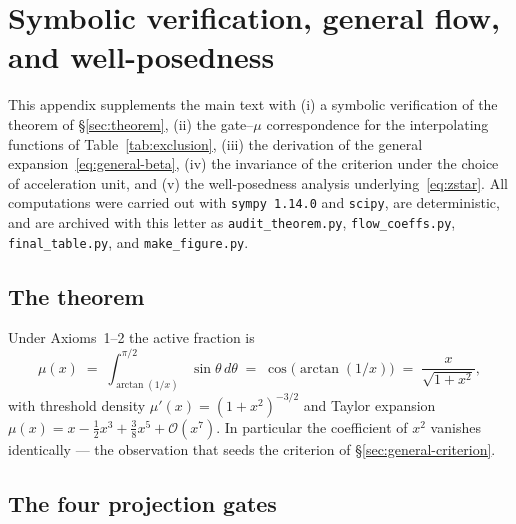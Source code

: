 \documentclass[11pt]{article}
\theoremstyle{plain}
\begin{document}
\appendix

\section{Symbolic verification, general flow, and well-posedness}
\label{app:audit}

This appendix supplements the main text with (i) a symbolic verification of the
theorem of \S\ref{sec:theorem}, (ii) the gate--$\mu$ correspondence for the
interpolating functions of Table~\ref{tab:exclusion}, (iii) the derivation of
the general expansion~\eqref{eq:general-beta}, (iv) the invariance of the
criterion under the choice of acceleration unit, and (v) the well-posedness
analysis underlying~\eqref{eq:zstar}. All computations were carried out with
\texttt{sympy 1.14.0} and \texttt{scipy}, are deterministic, and are archived
with this letter as \verb|audit_theorem.py|, \verb|flow_coeffs.py|,
\verb|final_table.py|, and \verb|make_figure.py|.

\subsection{The theorem}

Under Axioms~1--2 the active fraction is
\begin{equation}
\mu(x) \;=\; \int_{\arctan(1/x)}^{\pi/2} \sin\theta\,d\theta
       \;=\; \cos\!\bigl(\arctan(1/x)\bigr)
       \;=\; \frac{x}{\sqrt{1+x^{2}}},
\label{app:mu-thm}
\end{equation}
with threshold density $\mu'(x)=(1+x^{2})^{-3/2}$ and Taylor expansion
$\mu(x)=x-\tfrac12x^{3}+\tfrac38x^{5}+\mathcal{O}(x^{7})$. In particular the
coefficient of $x^{2}$ vanishes identically --- the observation that seeds the
criterion of \S\ref{sec:general-criterion}.

\subsection{The four projection gates}
\end{document}
